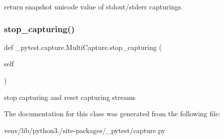 \begin{DoxyVerb}return snapshot unicode value of stdout/stderr capturings. \end{DoxyVerb}
 \mbox{\label{class__pytest_1_1capture_1_1_multi_capture_aac84e3d41faa2c2d9be845cabedc2aa9}} 
\subsubsection{\texorpdfstring{stop\+\_\+capturing()}{stop\_capturing()}}
{\footnotesize\ttfamily def \+\_\+pytest.\+capture.\+Multi\+Capture.\+stop\+\_\+capturing (\begin{DoxyParamCaption}\item[{}]{self }\end{DoxyParamCaption})}

\begin{DoxyVerb}stop capturing and reset capturing streams \end{DoxyVerb}
 

The documentation for this class was generated from the following file\+:\begin{DoxyCompactItemize}
\item 
venv/lib/python3./site-\/packages/\+\_\+pytest/capture.\+py\end{DoxyCompactItemize}
